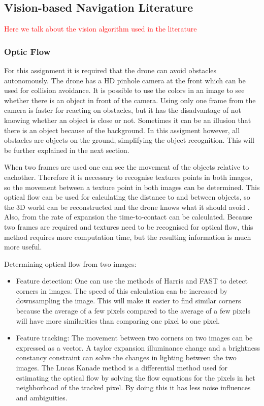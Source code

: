 \subsection{Vision-based Navigation Literature}
\label{subsec:lit_vision}
\textcolor{red}{Here we talk about the vision algorithm used in the literature}

\subsubsection{Optic Flow}

For this assignment it is required that the drone can avoid obstacles autonomously. The drone has a HD pinhole camera at the front which can be used for collision avoidance. It is possible to use the colors in an image to see whether there is an object in front of the camera. Using only one frame from the camera is faster for reacting on obstacles, but it has the disadvantage of not knowing whether an object is close or not. Sometimes it can be an illusion that there is an object because of the background. In this assigment however, all obstacles are objects on the ground, simplifying the object recognition. This will be further explained in the next section.

When two frames are used one can see the movement of the objects relative to eachother. Therefore it is necessary to recognise textures points in both images, so the movement between a texture point in both images can be determined. This optical flow can be used for calculating the distance to and between objects, so the 3D world can be reconstructed and the drone knows what it should avoid \cite{Gibson}. Also, from the rate of expansion the time-to-contact can be calculated. Because two frames are required and textures need to be recognised for optical flow, this method requires more computation time, but the resulting information is much more useful.

Determining optical flow from two images:

\begin{itemize}
\item Feature detection: One can use the methods of Harris and FAST to detect corners in images. The speed of this calculation can be increased by downsampling the image. This will make it easier to find similar corners  because the average of a few pixels compared to the average of a few pixels will have more similarities than comparing one pixel to one pixel.
\item Feature tracking: The movement between two corners on two images can be expressed as a vector. A taylor expansion illuminance change and a brightness constancy constraint   can solve the changes in lighting between the two images. The Lucas Kanade method is a differential method used for estimating the optical flow by solving the flow equations for the pixels in het neighborhood of the tracked pixel. By doing this it has less noise influences and ambiguities.
\end{itemize}



